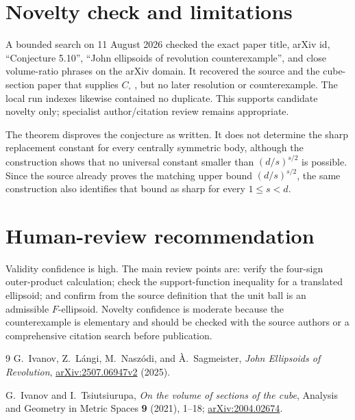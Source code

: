 \documentclass[11pt]{article}
\begin{document}
\section*{Novelty check and limitations}

A bounded search on 11 August 2026 checked the exact paper title, arXiv id,
``Conjecture 5.10'', ``John ellipsoids of revolution counterexample'', and
close volume-ratio phrases on the arXiv domain.  It recovered the source and
the cube-section paper that supplies \(C_{\square}\) \cite{cube}, but no later
resolution or counterexample.  The local run indexes likewise contained no
duplicate.  This supports candidate novelty only; specialist author/citation
review remains appropriate.

The theorem disproves the conjecture as written.  It does not determine the
sharp replacement constant for every centrally symmetric body, although the
construction shows that no universal constant smaller than
\((d/s)^{s/2}\) is possible.  Since the source already proves the matching
upper bound \((d/s)^{s/2}\), the same construction also identifies that bound
as sharp for every \(1\leq s<d\).

\section*{Human-review recommendation}

Validity confidence is high.  The main review points are: verify the four-sign
outer-product calculation; check the support-function inequality for a
translated ellipsoid; and confirm from the source definition that the unit
ball is an admissible \(F\)-ellipsoid.  Novelty confidence is moderate because
the counterexample is elementary and should be checked with the source
authors or a comprehensive citation search before publication.

\begin{thebibliography}{9}
G.~Ivanov, Z.~L\'angi, M.~Nasz\'odi, and \`A.~Sagmeister,
\emph{John Ellipsoids of Revolution},
\href{https://arxiv.org/abs/2507.06947}{arXiv:2507.06947v2} (2025).

G.~Ivanov and I.~Tsiutsiurupa,
\emph{On the volume of sections of the cube},
Analysis and Geometry in Metric Spaces \textbf{9} (2021), 1--18;
\href{https://arxiv.org/abs/2004.02674}{arXiv:2004.02674}.
\end{thebibliography}
\end{document}
